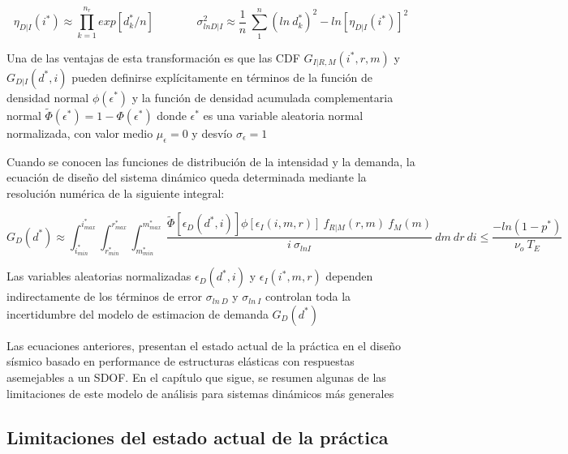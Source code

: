 \documentclass[
]{krantz}
\begin{document}
\[ \begin{equation} 
\eta_{D|I}(i^*) \approx \prod^{n_r}_{k=1}{exp [d_k^*/n]} \ \ \ \ \ \ \ \ \ \ \ \ \ \ \ \ \ \sigma_{lnD|I}^2 \approx \frac {1}{n} \ \sum^{n}_{1}{(ln \ d_k^*)^2} - ln [\eta_{D|I}(i^*)]^2
\end{equation}\]

Una de las ventajas de esta transformación es que las CDF \(G_{I|R,M}(i^*,r,m)\) y \(G_{D|I}(d^*,i)\) pueden definirse explícitamente en términos de la función de densidad normal \(\phi(\epsilon^*)\) y la función de densidad acumulada complementaria normal \(\tilde\Phi(\epsilon^*)=1-\Phi(\epsilon^*)\) donde \(\epsilon^*\) es una variable aleatoria normal normalizada, con valor medio \(\mu_{\epsilon}=0\) y desvío \(\sigma_{\epsilon}=1\)

Cuando se conocen las funciones de distribución de la intensidad y la demanda, la ecuación de diseño del sistema dinámico queda determinada mediante la resolución numérica de la siguiente integral:

\[ \begin{equation}  
G_D(d^*) \approx \int^{i_{max}^*}_{i_{min}^*} \int^{r_{max}^*}_{r_{min}^*}  \int^{m_{max}^*}_{m_{min}^*}  \ \frac{\tilde\Phi \left[ \epsilon_{D}(d^*,i) \right] \phi \left[\epsilon_{I}(i,m,r) \right]  \ f_{R|M}(r,m) \ f_M(m)}{ i \ \sigma_{ln I}} \  dm \ dr \ di \leq \frac {-ln \left(1-p^* \right)}{\nu_o \ T_E}  
\end{equation}\]

Las variables aleatorias normalizadas \(\epsilon_{D}(d^*,i)\) y \(\epsilon_{I}(i^*,m,r)\) dependen indirectamente de los términos de error \(\sigma_{ln \ D}\) y \(\sigma_{ln \ I}\) controlan toda la incertidumbre del modelo de estimacion de demanda \(G_D(d^*)\)

Las ecuaciones anteriores, presentan el estado actual de la práctica en el diseño sísmico basado en performance de estructuras elásticas con respuestas asemejables a un SDOF. En el capítulo que sigue, se resumen algunas de las limitaciones de este modelo de análisis para sistemas dinámicos más generales

\hypertarget{limitaciones-del-estado-actual-de-la-pruxe1ctica}{%
\subsection*{Limitaciones del estado actual de la práctica}\label{limitaciones-del-estado-actual-de-la-pruxe1ctica}}
\end{document}

